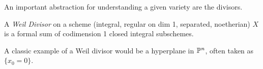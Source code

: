 \documentclass[12pt]{article}
\begin{document}
    An important abstraction for understanding a given variety are the divisors.
    \begin{definition}
        A \textit{Weil Divisor} on a scheme (integral, regular on dim 1, separated, noetherian) $X$ is a formal sum of codimension 1 closed integral subschemes.
    \end{definition}
    A classic example of a Weil divisor would be a hyperplane in $\mathbb{P}^n$,
    often taken as $\{x_0 = 0\}$.

\end{document}

